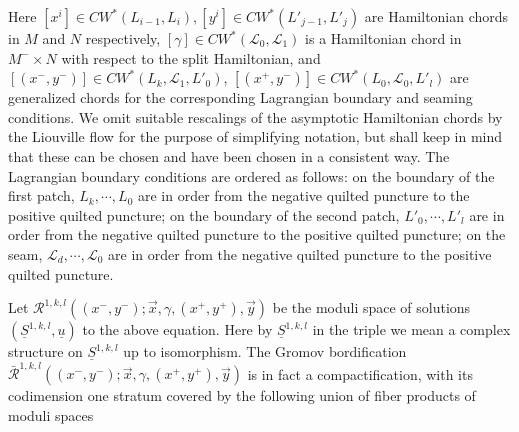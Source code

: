 \documentclass{amsart}
\numberwithin{equation}{section}
\numberwithin{figure}{section}
\begin{document}
Here $[x^{i}] \in CW^{*}(L_{i-1}, L_{i}), [y^{i}] \in CW^{*}(L'_{j-1}, L'_{j})$ are Hamiltonian chords in $M$ and $N$ respectively, $[\gamma] \in CW^{*}(\mathcal{L}_{0}, \mathcal{L}_{1})$ is a Hamiltonian chord in $M^{-} \times N$ with respect to the split Hamiltonian, and $[(x^{-}, y^{-})] \in CW^{*}(L_{k}, \mathcal{L}_{1}, L'_{0})$, $[(x^{+}, y^{-})] \in CW^{*}(L_{0}, \mathcal{L}_{0}, L'_{l})$ are generalized chords for the corresponding Lagrangian boundary and seaming conditions. We omit suitable rescalings of the asymptotic Hamiltonian chords by the Liouville flow for the purpose of simplifying notation, but shall keep in mind that these can be chosen and have been chosen in a consistent way. The Lagrangian boundary conditions are ordered as follows: on the boundary of the first patch, $L_{k}, \cdots, L_{0}$ are in order from the negative quilted puncture to the positive quilted puncture; on the boundary of the second patch, $L'_{0}, \cdots, L'_{l}$ are in order from the negative quilted puncture to the positive quilted puncture; on the seam, $\mathcal{L}_{d}, \cdots, \mathcal{L}_{0}$ are in order from the negative quilted puncture to the positive quilted puncture. \par
	Let $\mathcal{R}^{1, k, l}((x^{-}, y^{-}); \vec{x}, \gamma, (x^{+}, y^{+}), \vec{y})$ be the moduli space of solutions $(\underline{S}^{1, k, l}, \underline{u})$ to the above equation. Here by $\underline{S}^{1, k, l}$ in the triple we mean a complex structure on $\underline{S}^{1, k, l}$ up to isomorphism. The Gromov bordification $\bar{\mathcal{R}}^{1, k, l}((x^{-}, y^{-}); \vec{x}, \gamma, (x^{+}, y^{+}), \vec{y})$ is in fact a compactification, with its codimension one stratum covered by the following union of fiber products of moduli spaces
\end{document}
